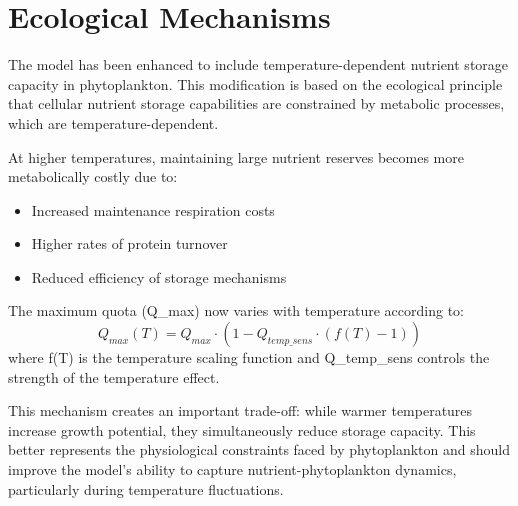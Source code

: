\section{Ecological Mechanisms}

The model has been enhanced to include temperature-dependent nutrient storage capacity in phytoplankton. This modification is based on the ecological principle that cellular nutrient storage capabilities are constrained by metabolic processes, which are temperature-dependent.

At higher temperatures, maintaining large nutrient reserves becomes more metabolically costly due to:
\begin{itemize}
\item Increased maintenance respiration costs
\item Higher rates of protein turnover
\item Reduced efficiency of storage mechanisms
\end{itemize}

The maximum quota (Q\_max) now varies with temperature according to:
\[ Q_{max}(T) = Q_{max} \cdot (1 - Q_{temp\_sens} \cdot (f(T) - 1)) \]
where f(T) is the temperature scaling function and Q\_temp\_sens controls the strength of the temperature effect.

This mechanism creates an important trade-off: while warmer temperatures increase growth potential, they simultaneously reduce storage capacity. This better represents the physiological constraints faced by phytoplankton and should improve the model's ability to capture nutrient-phytoplankton dynamics, particularly during temperature fluctuations.

